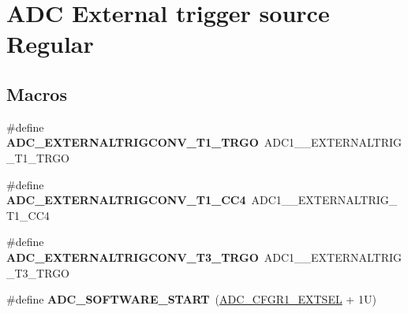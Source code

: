 \hypertarget{group___a_d_c___external__trigger__source___regular}{}\section{A\+DC External trigger source Regular}
\label{group___a_d_c___external__trigger__source___regular}
\subsection*{Macros}
\begin{DoxyCompactItemize}
\item 
\mbox{\label{group___a_d_c___external__trigger__source___regular_gabd4ea0756910a3cdd6942254473a40b3}} 
\#define {\bfseries A\+D\+C\+\_\+\+E\+X\+T\+E\+R\+N\+A\+L\+T\+R\+I\+G\+C\+O\+N\+V\+\_\+\+T1\+\_\+\+T\+R\+GO}~A\+D\+C1\+\_\+\_\+\+E\+X\+T\+E\+R\+N\+A\+L\+T\+R\+I\+G\+\_\+\+T1\+\_\+\+T\+R\+GO
\item 
\mbox{\label{group___a_d_c___external__trigger__source___regular_ga112435eac802af17d8a61d30a1e6d1dc}} 
\#define {\bfseries A\+D\+C\+\_\+\+E\+X\+T\+E\+R\+N\+A\+L\+T\+R\+I\+G\+C\+O\+N\+V\+\_\+\+T1\+\_\+\+C\+C4}~A\+D\+C1\+\_\+\_\+\+E\+X\+T\+E\+R\+N\+A\+L\+T\+R\+I\+G\+\_\+\+T1\+\_\+\+C\+C4
\item 
\mbox{\label{group___a_d_c___external__trigger__source___regular_ga41bef7b6bfdb6641a97e89aa4abc405e}} 
\#define {\bfseries A\+D\+C\+\_\+\+E\+X\+T\+E\+R\+N\+A\+L\+T\+R\+I\+G\+C\+O\+N\+V\+\_\+\+T3\+\_\+\+T\+R\+GO}~A\+D\+C1\+\_\+\_\+\+E\+X\+T\+E\+R\+N\+A\+L\+T\+R\+I\+G\+\_\+\+T3\+\_\+\+T\+R\+GO
\item 
\mbox{\label{group___a_d_c___external__trigger__source___regular_ga349ec6a1c2a362fba718cbfd068e50dc}} 
\#define {\bfseries A\+D\+C\+\_\+\+S\+O\+F\+T\+W\+A\+R\+E\+\_\+\+S\+T\+A\+RT}~(\hyperlink{group___peripheral___registers___bits___definition_ga01460f832e7bd04e150f86425aa922dd}{A\+D\+C\+\_\+\+C\+F\+G\+R1\+\_\+\+E\+X\+T\+S\+EL} + 1\+U)
\item 
\mbox{\label{group___a_d_c___external__trigger__source___regular_gaa964f17f527400095888ca28c65507c4}} 

\end{DoxyCompactItemize}
